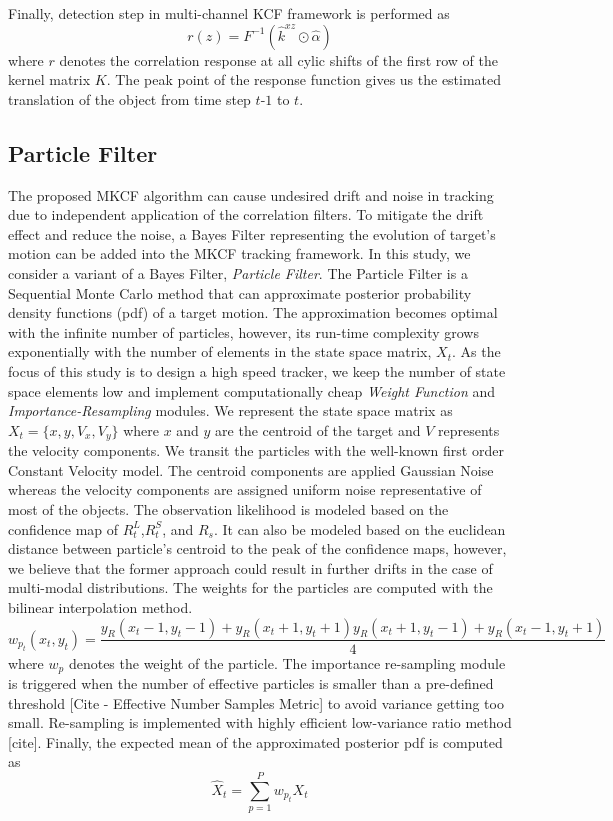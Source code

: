 \documentclass{bmvc2k}
\begin{document}
Finally, detection step in multi-channel KCF framework is performed as
\begin{equation}
r(z) = F^{-1}(\hat{k}^{xz} \odot \hat{\alpha})
\end{equation}
where $r$ denotes the correlation response at all cylic shifts of the
first row of the kernel matrix $K$. The peak point of the response
function gives us the estimated translation of the object from time
step $t$-$1$ to $t$.

\subsection{Particle Filter} \label{sc:PF}
The proposed MKCF algorithm can cause undesired drift and noise in
tracking due to independent application of the correlation filters. To
mitigate the drift effect and reduce the noise, a Bayes Filter
representing the evolution of target's motion can be added into the
MKCF tracking framework. In this study, we consider a variant of a
Bayes Filter, \textit{Particle Filter}. The Particle Filter is a
Sequential Monte Carlo method that can approximate posterior
probability density functions (pdf) of a target motion. The
approximation becomes optimal with the infinite number of particles,
however, its run-time complexity grows exponentially with the number
of elements in the state space matrix, $X_{t}$. As the focus of this
study is to design a high speed tracker, we keep the number of state
space elements low and implement computationally cheap \textit{Weight
  Function} and \textit{Importance-Resampling} modules. We represent
the state space matrix as $X_{t} = \lbrace x,y,V_{x},V_{y}\rbrace$
where $x$ and $y$ are the centroid of the target and $V$ represents
the velocity components. We transit the particles with the well-known
first order Constant Velocity model. The centroid components are
applied Gaussian Noise whereas the velocity components are assigned
uniform noise representative of most of the objects. The observation
likelihood is modeled based on the confidence map of
$R_{t}^{L}$,$R_{t}^{S}$, and $R_{s}$. It can also be modeled based on
the euclidean distance between particle's centroid to the peak of the
confidence maps, however, we believe that the former approach could
result in further drifts in the case of multi-modal distributions. The
weights for the particles are computed with the bilinear interpolation
method.
\begin{equation}
	w_{p_{t}}(x_{t},y_{t}) = \dfrac{y_{R}(x_{t}-1,y_{t}-1)+y_{R}(x_{t}+1,y_{t}+1){y_{R}(x_{t}+1,y_{t}-1)+y_{R}(x_{t}-1,y_{t}+1)}}{4}
\end{equation}
where $w_{p}$ denotes the weight of the particle. The importance
re-sampling module is triggered when the number of effective particles
is smaller than a pre-defined threshold [Cite - Effective Number
  Samples Metric] to avoid variance getting too small. Re-sampling is
implemented with highly efficient low-variance ratio method
[cite]. Finally, the expected mean of the approximated posterior pdf
is computed as
\begin{equation}
	\hat{X}_{t} = \sum_{p=1}^{P}w_{p_{t}} X_{t}
\end{equation}
\end{document}
